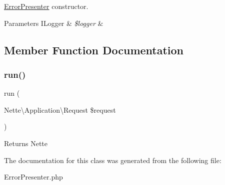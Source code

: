 \mbox{\hyperlink{class_app_1_1_presenters_1_1_error_presenter}{Error\+Presenter}} constructor.


\begin{DoxyParams}[1]{Parameters}
I\+Logger & {\em \$logger} & \\
\hline
\end{DoxyParams}


\subsection{Member Function Documentation}
\mbox{\label{class_app_1_1_presenters_1_1_error_presenter_a7d2a09004db8fd54068d96170b66654c}} 
\subsubsection{\texorpdfstring{run()}{run()}}
{\footnotesize\ttfamily run (\begin{DoxyParamCaption}\item[{Nette\textbackslash{}\+Application\textbackslash{}\+Request}]{\$request }\end{DoxyParamCaption})}

\begin{DoxyReturn}{Returns}
Nette 
\end{DoxyReturn}


The documentation for this class was generated from the following file\+:\begin{DoxyCompactItemize}
\item 
Error\+Presenter.\+php\end{DoxyCompactItemize}
